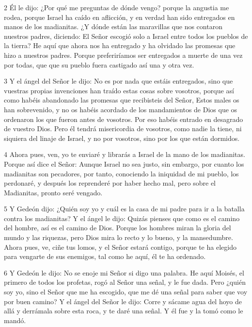 \par 2 Él le dijo: ¿Por qué me preguntas de dónde vengo? porque la angustia me rodea, porque Israel ha caído en aflicción, y en verdad han sido entregados en manos de los madianitas. ¿Y dónde están las maravillas que nos contaron nuestros padres, diciendo: El Señor escogió solo a Israel entre todos los pueblos de la tierra? He aquí que ahora nos ha entregado y ha olvidado las promesas que hizo a nuestros padres. Porque preferiríamos ser entregados a muerte de una vez por todas, que que su pueblo fuera castigado así una y otra vez.

\par 3 Y el ángel del Señor le dijo: No es por nada que estáis entregados, sino que vuestras propias invenciones han traído estas cosas sobre vosotros, porque así como habéis abandonado las promesas que recibisteis del Señor, Estos males os han sobrevenido, y no os habéis acordado de los mandamientos de Dios que os ordenaron los que fueron antes de vosotros. Por eso habéis entrado en desagrado de vuestro Dios. Pero él tendrá misericordia de vosotros, como nadie la tiene, ni siquiera del linaje de Israel, y no por vosotros, sino por los que están dormidos.

\par 4 Ahora pues, ven, yo te enviaré y librarás a Israel de la mano de los madianitas. Porque así dice el Señor: Aunque Israel no sea justo, sin embargo, por cuanto los madianitas son pecadores, por tanto, conociendo la iniquidad de mi pueblo, los perdonaré, y después los reprenderé por haber hecho mal, pero sobre el Madianitas, pronto seré vengado.

\par 5 Y Gedeón dijo: ¿Quién soy yo y cuál es la casa de mi padre para ir a la batalla contra los madianitas? Y el ángel le dijo: Quizás pienses que como es el camino del hombre, así es el camino de Dios. Porque los hombres miran la gloria del mundo y las riquezas, pero Dios mira lo recto y lo bueno, y la mansedumbre. Ahora pues, ve, ciñe tus lomos, y el Señor estará contigo, porque te ha elegido para vengarte de sus enemigos, tal como he aquí, él te ha ordenado.

\par 6 Y Gedeón le dijo: No se enoje mi Señor si digo una palabra. He aquí Moisés, el primero de todos los profetas, rogó al Señor una señal, y le fue dada. Pero ¿quién soy yo, sino el Señor que me ha escogido, que me dé una señal para saber que voy por buen camino? Y el ángel del Señor le dijo: Corre y sácame agua del hoyo de allá y derrámala sobre esta roca, y te daré una señal. Y él fue y la tomó como le mandó.


